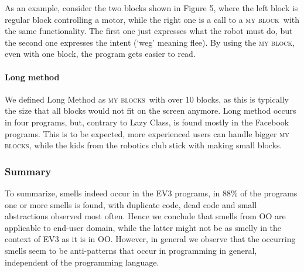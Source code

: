 \documentclass{sig-alternate}
\newcommand{\mbs}{\textsc{my blocks}}
\newcommand{\mb}{\textsc{my block}}
\begin{document}
As an example, consider the two blocks shown in Figure 5, where the left block is regular block controlling a motor, while the right one is a call to a \mb~with the same functionality. The first one just expresses what the robot must do, but the second one expresses the intent (`weg' meaning flee). By using the \mb, even with one block, the program gets easier to read.

\paragraph{Long method}
We defined Long Method as \mbs~with over 10 blocks, as this is typically the size that all blocks would not fit on the screen anymore. Long method occurs in four programs, but, contrary to Lazy Class, is found mostly in the Facebook programs. This is to be expected, more experienced users can handle bigger \mbs, while the kids from the robotics club stick with making small blocks.

\subsubsection{Summary}
To summarize, smells indeed occur in the EV3 programs, in 88\% of the programs one or more smells is found, with duplicate code, dead code and small abstractions observed most often. Hence we conclude that smells from OO are applicable to end-user domain, while the latter might not be as smelly in the context of EV3 as it is in OO. However, in general we observe that the occurring smells seem to be anti-patterns that occur in programming in general, independent of the programming language. 
\end{document}
